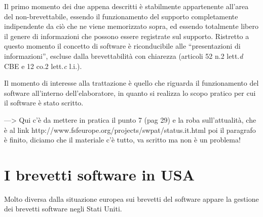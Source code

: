 Il primo momento dei due appena descritti è stabilmente appartenente all'area del non-brevettabile, essendo il funzionamento del supporto completamente indipendente da ciò che ne viene memorizzato sopra, ed essendo totalmente libero il genere di informazioni che possono essere registrate sul supporto. Ristretto a questo momento il concetto di software è riconducibile alle ``presentazioni di informazioni'', escluse dalla brevettabilità con chiarezza (articoli 52 n.2 lett.\textit{d} CBE e 12 co.2 lett.\textit{c} l.i.).

Il momento di interesse alla trattazione è quello che riguarda il funzionamento del software all'interno dell'elaboratore, in quanto si realizza lo scopo pratico per cui il software è stato scritto.

---> Qui c'è da mettere in pratica il punto 7 (pag 29) e la roba sull'attualità, che è al link http://www.fsfeurope.org/projects/swpat/status.it.html poi il paragrafo è finito, diciamo che il materiale c'è tutto, va scritto ma non è un problema!
\section{I brevetti software in USA}
Molto diversa dalla situazione europea sui brevetti del software appare la gestione dei brevetti software negli Stati Uniti.  






